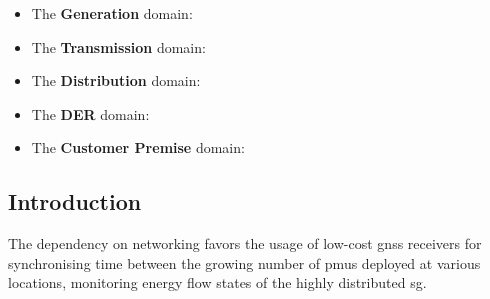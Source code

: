 



\begin{itemize}
    \item The \textbf{Generation} domain:
    \item The \textbf{Transmission} domain:
    \item The \textbf{Distribution} domain:
    \item The \textbf{DER} domain:
    \item The \textbf{Customer Premise} domain:
\end{itemize}


\subsection{Introduction}


The dependency on networking favors the usage of low-cost \acrshort{gnss} receivers for synchronising time between the growing number of \acrshort{pmu}s deployed at various locations, monitoring energy flow states of the highly distributed \acrshort{sg}. 


